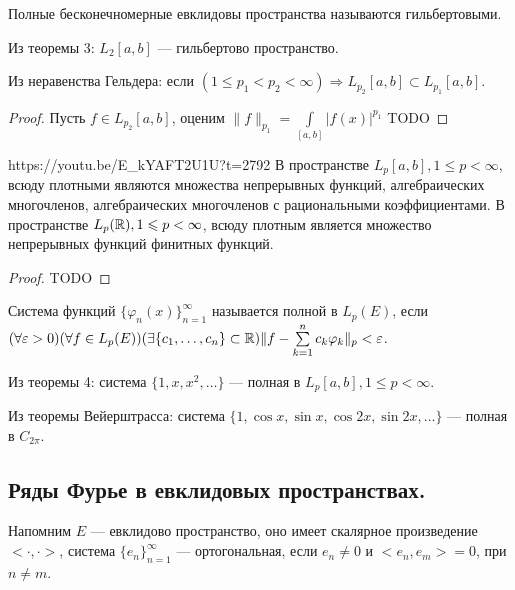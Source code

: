 \begin{Def}
	Полные бесконечномерные евклидовы пространства называются гильбертовыми.
\end{Def}

\begin{corollary}
	Из теоремы 3: $L_2[a,b]$ --- гильбертово пространство.
\end{corollary}

\begin{corollary}
	Из неравенства Гельдера: если $(1\leqslant p_1<p_2<\infty)\Rightarrow L_{p_2}[a,b]\subset L_{p_1}[a,b]$.
\end{corollary}
\begin{proof}
	Пусть $f\in L_{p_2}[a,b]$, оценим $\|f\|_{p_1}=\int\limits_{[a,b]} |f(x)|^{p_1}$ TODO
\end{proof}

\begin{linkthm}{https://youtu.be/E_kYAFT2U1U?t=2792}
	В пространстве $L_p[a,b], 1\leqslant p<\infty$, всюду плотными являются множества непрерывных функций, алгебраических многочленов, алгебраических многочленов с рациональными коэффициентами. В пространстве $L_p(\mathbb{R}), 1\leqslant p<\infty$, всюду плотным является множество непрерывных функций финитных функций.
\end{linkthm}

\begin{proof}
	TODO
\end{proof}

\begin{Def}
	Система функций $\{\varphi_n(x)\}_{n=1}^\infty$ называется полной в $L_p(E)$, если \\$(\forall\varepsilon>0)(\forall f\in L_p(E))(\exists \{c_1,\ldots,c_n\}\subset\mathbb{R})\|f-\sum\limits_{k=1}^n c_k\varphi_k\|_p<\varepsilon$.
\end{Def}

\begin{corollary}
	 Из теоремы 4: система $\{1,x,x^2,\ldots\}$ --- полная в $L_p[a,b], 1\leqslant p<\infty$.
\end{corollary}
 
\begin{corollary}
	Из теоремы Вейерштрасса: система $\{1,\cos x,\sin x, \cos 2x, \sin 2x,\ldots\}$ --- полная в $C_{2\pi}$.
\end{corollary}

\subsection{Ряды Фурье в евклидовых пространствах.}
Напомним $E$ --- евклидово пространство, оно имеет скалярное произведение $<\cdot,\cdot>$, система $\{e_n\}_{n=1}^\infty$ --- ортогональная, если $e_n\ne 0$ и $<e_n,e_m>=0$, при $n\ne m$.

